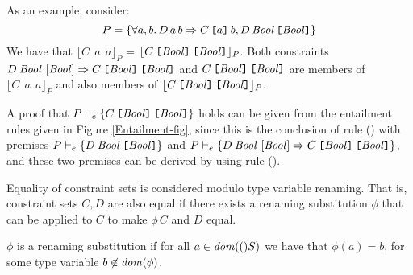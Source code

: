 \begin{Example} {\rm
As an example, consider:
  \[ P = \{ \forall a,b.\,D\, a\,
             b\Rightarrow C\, \text{\tt{[$a$]}}\, b, D\, \text{\it Bool\/}\,
             \text{\tt {[{\it Bool\/}]}}\}\]
We have that
  $\lfloor C\:\:a\:\:a\rfloor_P$ =
  $\lfloor C\:\text{\tt{[\it Bool\/}]}\: \text{\tt{[\it Bool\/}]}\rfloor_P$.
Both constraints
  $D\:\text{{\it Bool\/}\ [{\it Bool\/}]} \Rightarrow C\:\text{\tt{[{\it Bool\/}]}}\: \text{\tt [{\it Bool\/}]}$
and
  $C\:\text{\tt{[{\it Bool\/}]}}\: \text{\tt [{\it Bool\/}]}$
are members of
  $\lfloor C\:\:a\:\:a\rfloor_P$ and also members of
  $\lfloor C\:\text{\tt{[\it Bool\/}]}\: \text{\tt{[\it Bool\/}]}\rfloor_P$.

A proof that $P \vdash_e \{ C\:\text{\tt{[\it Bool\/}]}\: \text{\tt{[\it Bool\/}]} \}$
holds can be given from the entailment rules given in Figure \ref{Entailment-fig},
since this is the conclusion of rule (\entmp) with premises
  $P \vdash_e \{ D\:\text{\it Bool\/}\: \text{\tt{[\it Bool\/}]} \}$ and
  $P \vdash_e \{ D\:\text{{\it Bool\/}\ [{\it Bool\/}]} \Rightarrow C\:\text{\tt{[{\it Bool\/}]}}
                                                                               \:\text{\tt{[{\it Bool\/}]}}\}$,
and these two premises can be derived by using rule (\entinst).}

\end{Example}

Equality of constraint sets is considered modulo type variable
renaming. That is, constraint sets $C,D$ are also equal if there
exists a renaming substitution $\phi$ that can be applied to $C$ to
make $\phi\,C$ and $D$ equal.

$\phi$ is a renaming substitution if for all $a\in\mathit{dom}(()S)$ we have
that $\phi(a)=b$, for some type variable $b\not\in\mathit{dom}(\phi)$.


